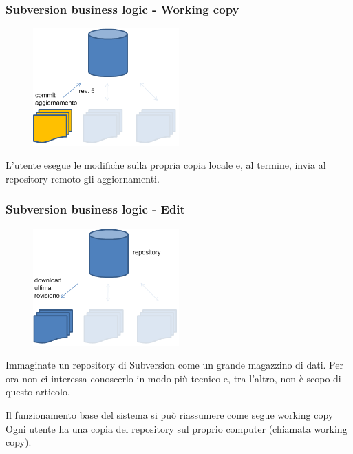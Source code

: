 \documentclass[10pt]{beamer}
\begin{document}
\begin{frame}[fragile]
\frametitle{Subversion business logic - Working copy}
\begin{figure}[h]
 \centering
 \includegraphics[width=0.5\textwidth]{images/svn-step2.png}
\end{figure}
L’utente esegue le modifiche sulla propria copia locale e, al termine, invia al repository remoto gli aggiornamenti.
\end{frame}

\begin{frame}[fragile]
\frametitle{Subversion business logic - Edit}
\begin{figure}[h]
 \centering
 \includegraphics[width=0.5\textwidth]{images/svn-step1.png}
\end{figure}
Immaginate un repository di Subversion come un grande magazzino di dati.
Per ora non ci interessa conoscerlo in modo più tecnico e, tra l’altro, non è scopo di questo articolo.

Il funzionamento base del sistema si può riassumere come segue
working copy
Ogni utente ha una copia del repository sul proprio computer (chiamata working copy).
\end{frame}
\end{document}

